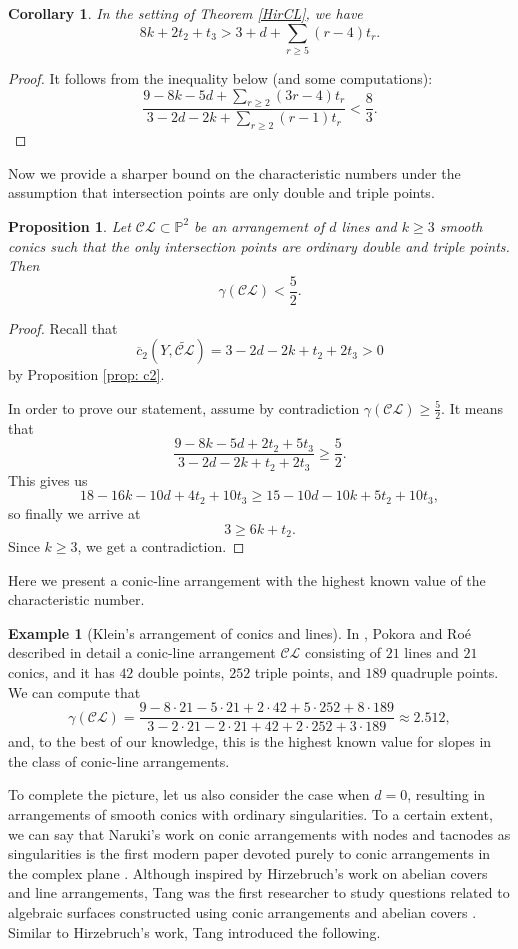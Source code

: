 \documentclass{article}
\theoremstyle{plain}
\newtheorem{proposition}[thm]{Proposition}
\newtheorem{corollary}[thm]{Corollary}
\theoremstyle{definition}
\newtheorem{example}[thm]{Example}
\numberwithin{equation}{section}
\begin{document}
\begin{corollary}
In the setting of Theorem \ref{HirCL}, we have
\[8k + 2t_{2}+t_{3} > 3+d + \sum_{r\geq 5}(r-4)t_{r}.\]
\end{corollary}
\begin{proof}
It follows from the inequality below (and some computations):
\[\frac{9-8k-5d + \sum_{r\geq 2}(3r-4)t_{r}}{3-2d-2k + \sum_{r\geq 2}(r-1)t_{r}} < \frac{8}{3}.\]
\end{proof}
Now we provide a sharper bound on the characteristic numbers under the assumption that intersection points are only double and triple points.
\begin{proposition}
Let $\mathcal{CL} \subset \mathbb{P}^{2}$ be an arrangement of $d$ lines and $k\geq 3$ smooth conics such that the only intersection points are ordinary double and triple points. Then
\[\gamma(\mathcal{CL}) < \frac{5}{2}.\]
\end{proposition}
\begin{proof}
Recall that
\[\overline{c}_{2}(Y,\widetilde{\mathcal{CL}})=3-2d-2k+t_{2} + 2t_{3}> 0\]
by Proposition \ref{prop: c2}.

In order to prove our statement, assume by contradiction $\gamma(\mathcal{CL}) \geq \frac{5}{2}$. It means that
\[\frac{9-8k-5d+2t_{2}+5t_{3}}{3-2d-2k+t_{2}+2t_{3}}\geq \frac{5}{2}.\]
This gives us
\[18 - 16k - 10d +4t_{2} + 10t_{3} \geq 15 - 10d - 10k + 5t_{2} + 10t_{3},\]
so finally we arrive at
\[3 \geq 6k+t_{2}.\]
Since $k\geq 3$, we get a contradiction.
\end{proof}
Here we present a conic-line arrangement with the highest known value of the characteristic number.
\begin{example}[Klein's arrangement of conics and lines]
In \cite{PR2019}, Pokora and Ro\'e described in detail a conic-line arrangement $\mathcal{CL}$ consisting of $21$ lines and $21$ conics, and it has $42$ double points, $252$ triple points, and $189$ quadruple points. We can compute that
\[\gamma(\mathcal{CL}) = \frac{9-8\cdot 21 - 5\cdot 21 + 2\cdot 42 + 5\cdot 252 + 8\cdot 189}{3-2\cdot 21 - 2\cdot 21 + 42 + 2\cdot 252 + 3\cdot 189} \approx 2.512,\] and, to the best of our knowledge, this is the highest known value for slopes in the class of conic-line arrangements.
\end{example}
To complete the picture, let us also consider the case when $d = 0$, resulting in arrangements of smooth conics with ordinary singularities. To a certain extent, we can say that Naruki's work on conic arrangements with nodes and tacnodes as singularities is the first modern paper devoted purely to conic arrangements in the complex plane \cite{Naruki}. Although inspired by Hirzebruch's work on abelian covers and line arrangements, Tang was the first researcher to study questions related to algebraic surfaces constructed using conic arrangements and abelian covers \cite{Tang}. Similar to Hirzebruch's work, Tang introduced the following.
\end{document}
